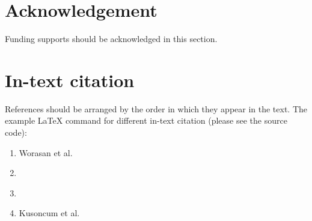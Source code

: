 \documentclass[11pt, a4paper, twocolumn]{article}
\begin{document}
\section*{Acknowledgement}
\label{acknowledgement}
Funding supports should be acknowledged in this section.\\

\par

\section{In-text citation}
References should be arranged by the order in which they appear in the text. The example \LaTeX{} command for different in-text citation (please see the source code):
\begin{enumerate}
    \item Worasan et al. \cite{worasan2020hybrid}
    \item \citeauthor{worasan2020hybrid}
    \item \citeyear{worasan2020hybrid}
    \item Kusoncum et al. \cite{kusoncum2021heuristics}

\end{enumerate}

% 
% 
\printbibliography
\end{document}
